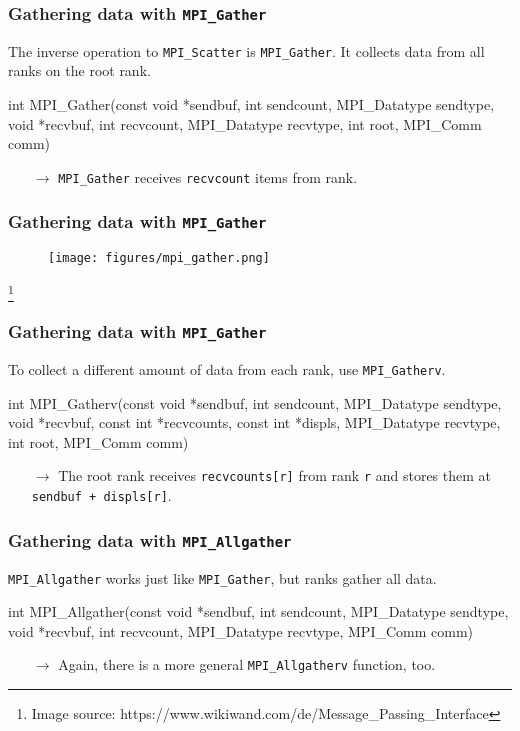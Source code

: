\documentclass[12pt,t]{beamer}
\newcommand\blfootnote[1]{%
  \begingroup
  \renewcommand\thefootnote{}\footnote{\tiny #1}%
  \addtocounter{footnote}{-1}%
  \endgroup
}
\let\emph\relax %
\newcommand{\conclude}[1]{%
  \begin{itemize}
    \item[$\rightarrow$]#1
  \end{itemize}
}
\begin{document}
  \begin{frame}[fragile]
    \frametitle{Gathering data with \texttt{MPI\_Gather}}

    The inverse operation to \texttt{MPI\_Scatter} is \texttt{MPI\_Gather}.
    It collects data from all ranks on the root rank.
    \begin{code}
int MPI_Gather(const void *sendbuf,
               int sendcount,
               MPI_Datatype sendtype,
               void *recvbuf,
               int recvcount,
               MPI_Datatype recvtype,
               int root,
               MPI_Comm comm)
    \end{code}
    \conclude{\texttt{MPI\_Gather} receives \texttt{recvcount} items from \emph{each} rank.}
  \end{frame}

  \begin{frame}[fragile]
    \frametitle{Gathering data with \texttt{MPI\_Gather}}

    \begin{figure}
      \centering
      \texttt{[image: figures/mpi\_gather.png]}
    \end{figure}
    \blfootnote{Image source: https://www.wikiwand.com/de/Message\_Passing\_Interface}
  \end{frame}

  \begin{frame}[fragile]
    \frametitle{Gathering data with \texttt{MPI\_Gather}}

    To collect a different amount of data from each rank, use \texttt{MPI\_Gatherv}.
    \begin{code}
int MPI_Gatherv(const void *sendbuf,
                int sendcount,
                MPI_Datatype sendtype,
                void *recvbuf,
                const int *recvcounts,
                const int *displs,
                MPI_Datatype recvtype,
                int root,
                MPI_Comm comm)
    \end{code}
    \conclude{The root rank receives \texttt{recvcounts[r]} from rank \texttt{r} and stores them at \texttt{sendbuf + displs[r]}.}
  \end{frame}

  \begin{frame}[fragile]
    \frametitle{Gathering data with \texttt{MPI\_Allgather}}

    \texttt{MPI\_Allgather} works just like \texttt{MPI\_Gather}, but \emph{all} ranks gather all data.
    \begin{code}
int MPI_Allgather(const void *sendbuf,
                  int sendcount,
                  MPI_Datatype sendtype,
                  void *recvbuf,
                  int recvcount,
                  MPI_Datatype recvtype,
                  MPI_Comm comm)
    \end{code}
    \conclude{Again, there is a more general \texttt{MPI\_Allgatherv} function, too.}
  \end{frame}
\end{document}
